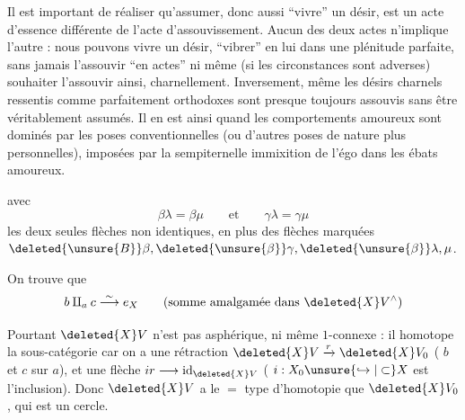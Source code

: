 Il est important de réaliser qu’assumer, donc aussi ``vivre'' un désir, est un acte d’essence différente de l’acte d’assouvissement. Aucun des deux actes n’implique l’autre : nous pouvons vivre un désir, ``vibrer'' en lui dans une plénitude parfaite, sans jamais l’assouvir ``en actes'' ni même (si les circonstances sont adverses) souhaiter l’assouvir ainsi, charnellement. Inversement, même les désirs charnels ressentis comme parfaitement orthodoxes sont presque toujours assouvis sans être véritablement assumés. Il en est ainsi quand les comportements amoureux sont dominés par les poses conventionnelles (ou d’autres poses de nature plus personnelles), imposées par la sempiternelle immixition de l’égo dans les ébats amoureux.



avec
\[
\beta\lambda=\beta\mu\qquad\text{et}\qquad\gamma\lambda=\gamma\mu
\]
les deux seules flèches non identiques, en plus des  flèches marquées $\deleted{\unsure{B}}\beta,\deleted{\unsure{\beta}}\gamma,\deleted{\unsure{\beta}}\lambda,\mu$.

On trouve que 
\[
b\amalg_a c \overset{\sim}{\longrightarrow}e_X
\qquad\text{(somme amalgamée dans $\deleted{X}V^{\wedge}$)}
\]

Pourtant $\deleted{X}V$ n’est pas asphérique, ni même $1$-connexe : il   homotope  la sous-catégorie 
 car on a une rétraction $\deleted{X}V\xrightarrow{r}\deleted{X}V_0$ ( $b$ et $c$ sur $a$), et  une flèche $ir\longrightarrow\mathrm{id}_{\deleted{X}V}$ ( $i:X_0\unsure{\hookrightarrow|\subset}X$ est l’inclusion). Donc $\deleted{X}V$ a le $=$ type d’homotopie que \uline{$\deleted{X}V_0$}, qui est un cercle.

